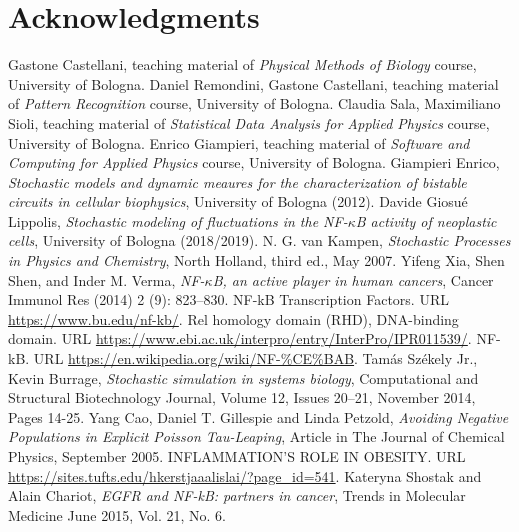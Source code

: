 \documentclass[12pt,a4paper]{report}
\begin{document}
\chapter*{Acknowledgments}
\begin{thebibliography}{bibliography}
      Gastone Castellani, teaching material of {\em Physical Methods of Biology} course, University of Bologna.
     Daniel Remondini, Gastone Castellani, teaching material of {\em Pattern Recognition} course, University of Bologna.
     Claudia Sala, Maximiliano Sioli, teaching material of {\em Statistical Data Analysis for Applied Physics} course, University of Bologna.
     Enrico Giampieri, teaching material of {\em Software and Computing for Applied Physics} course, University of Bologna.
     Giampieri Enrico, {\em Stochastic models and dynamic meaures for the characterization of bistable circuits in cellular biophysics}, University of Bologna (2012).
     Davide Giosué Lippolis, {\em Stochastic modeling of fluctuations in the NF-$\kappa$B activity of neoplastic cells}, University of Bologna (2018/2019).
     N. G. van Kampen, {\em Stochastic Processes in Physics and Chemistry}, North Holland, third ed., May 2007.
     Yifeng Xia, Shen Shen, and Inder M. Verma, {\em NF-$\kappa$B, an active player in human cancers}, Cancer Immunol Res (2014) 2 (9): 823–830.
     NF-kB Transcription Factors. URL \url{https://www.bu.edu/nf-kb/}.
     Rel homology domain (RHD), DNA-binding domain. URL \url{https://www.ebi.ac.uk/interpro/entry/InterPro/IPR011539/}.
	 NF-kB. URL \url{https://en.wikipedia.org/wiki/NF-%CE%BAB}.
     Tamás Székely Jr., Kevin Burrage, {\em Stochastic simulation in systems biology}, Computational and Structural Biotechnology Journal, Volume 12, Issues 20–21, November 2014, Pages 14-25.
     Yang Cao, Daniel T. Gillespie and Linda Petzold, {\em Avoiding Negative Populations in Explicit Poisson Tau-Leaping}, Article  in  The Journal of Chemical Physics, September 2005.
     INFLAMMATION'S ROLE IN OBESITY. URL \url{https://sites.tufts.edu/hkerstjaaalislai/?page_id=541}.
     Kateryna Shostak and Alain Chariot, {\em EGFR and NF-kB: partners in cancer}, Trends in Molecular Medicine June 2015, Vol. 21, No. 6.

\end{thebibliography}
\end{document}
